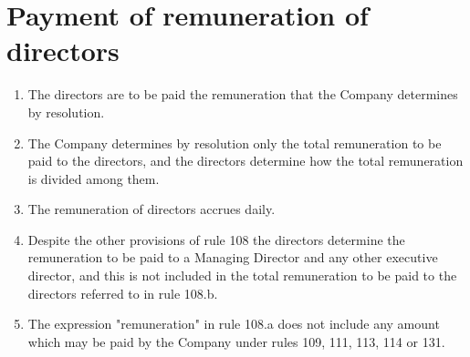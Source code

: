 \section{Payment of remuneration of directors}

\begin{enumerate}[label=(\alph*)]
    \item The directors are to be paid the remuneration that the Company determines by resolution.
    
    \item The Company determines by resolution only the total remuneration to be paid to the directors, and the directors determine how the total remuneration is divided among them.
    
    \item The remuneration of directors accrues daily.
    
    \item Despite the other provisions of rule 108 the directors determine the remuneration to be paid to a Managing Director and any other executive director, and this is not included in the total remuneration to be paid to the directors referred to in rule 108.b.
    
    \item The expression "remuneration" in rule 108.a does not include any amount which may be paid by the Company under rules 109, 111, 113, 114 or 131.
\end{enumerate} 